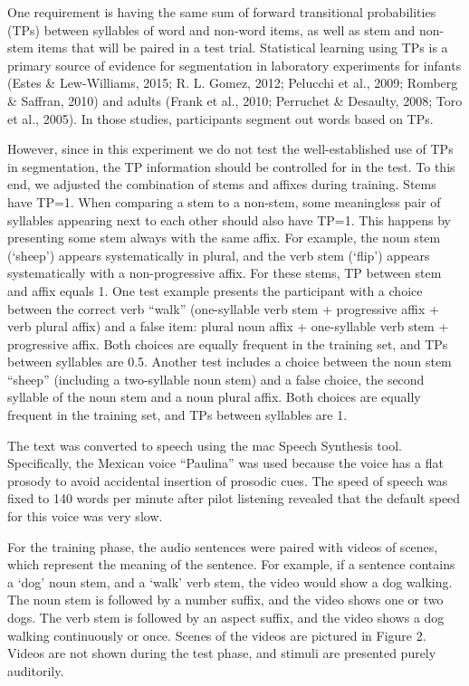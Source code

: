 \documentclass[
  american,
  ,man,floatsintext]{apa6}
\begin{document}
One requirement is having the same sum of forward transitional probabilities (TPs) between syllables of word and non-word items, as well as stem and non-stem items that will be paired in a test trial. Statistical learning using TPs is a primary source of evidence for segmentation in laboratory experiments for infants (Estes \& Lew-Williams, 2015; R. L. Gomez, 2012; Pelucchi et al., 2009; Romberg \& Saffran, 2010) and adults (Frank et al., 2010; Perruchet \& Desaulty, 2008; Toro et al., 2005). In those studies, participants segment out words based on TPs.

However, since in this experiment we do not test the well-established use of TPs in segmentation, the TP information should be controlled for in the test. To this end, we adjusted the combination of stems and affixes during training. Stems have TP=1. When comparing a stem to a non-stem, some meaningless pair of syllables appearing next to each other should also have TP=1. This happens by presenting some stem always with the same affix. For example, the noun stem (`sheep') appears systematically in plural, and the verb stem (`flip') appears systematically with a non-progressive affix. For these stems, TP between stem and affix equals 1. One test example presents the participant with a choice between the correct verb ``walk'' (one-syllable verb stem + progressive affix + verb plural affix) and a false item: plural noun affix + one-syllable verb stem + progressive affix. Both choices are equally frequent in the training set, and TPs between syllables are 0.5. Another test includes a choice between the noun stem ``sheep'' (including a two-syllable noun stem) and a false choice, the second syllable of the noun stem and a noun plural affix. Both choices are equally frequent in the training set, and TPs between syllables are 1.

The text was converted to speech using the mac Speech Synthesis tool. Specifically, the Mexican voice ``Paulina'' was used because the voice has a flat prosody to avoid accidental insertion of prosodic cues. The speed of speech was fixed to 140 words per minute after pilot listening revealed that the default speed for this voice was very slow.

For the training phase, the audio sentences were paired with videos of scenes, which represent the meaning of the sentence. For example, if a sentence contains a `dog' noun stem, and a `walk' verb stem, the video would show a dog walking. The noun stem is followed by a number suffix, and the video shows one or two dogs. The verb stem is followed by an aspect suffix, and the video shows a dog walking continuously or once. Scenes of the videos are pictured in Figure 2. Videos are not shown during the test phase, and stimuli are presented purely auditorily.
\end{document}
